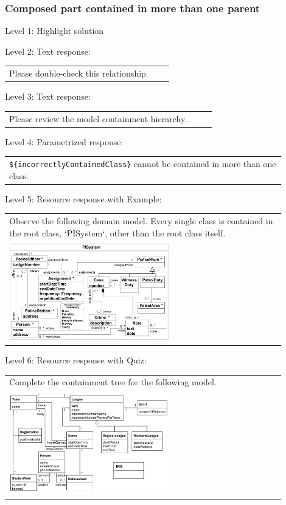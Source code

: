 \subsubsection{Composed part contained in more than one parent}

\noindent Level 1: Highlight solution \medskip

\noindent Level 2: Text response: \medskip

\begin{tabular}{|p{0.9\linewidth}}
Please double-check this relationship.
\end{tabular} \medskip

\noindent Level 3: Text response: \medskip

\begin{tabular}{|p{0.9\linewidth}}
Please review the model containment hierarchy.
\end{tabular} \medskip

\noindent Level 4: Parametrized response: \medskip

\begin{tabular}{|p{0.9\linewidth}}
\verb|${incorrectlyContainedClass}| cannot be contained in more than one class.
\end{tabular} \medskip

\noindent Level 5: Resource response with Example: \medskip

\begin{tabular}{|p{0.9\linewidth}}
Observe the following domain model. Every single class is contained in the 
root class, `PISystem`, other than the root class itself.

\\
\includegraphics[width=0.6\textwidth]{images/PISystem.png}
\end{tabular} \medskip

\noindent Level 6: Resource response with Quiz: \medskip

\begin{tabular}{|p{0.9\linewidth}}
Complete the containment tree for the following model.

\\
\includegraphics[width=0.6\textwidth]{images/IRS.png}
\end{tabular} \medskip


